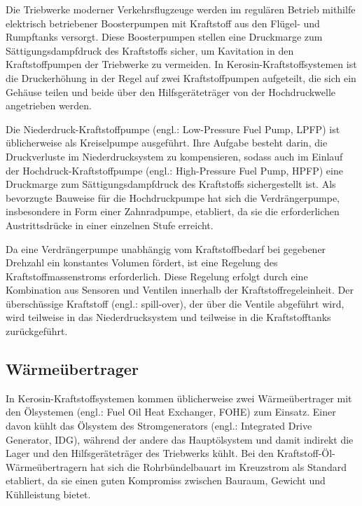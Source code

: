 Die Triebwerke moderner Verkehrsflugzeuge werden im regulären Betrieb mithilfe elektrisch betriebener Boosterpumpen mit Kraftstoff aus den Flügel- und Rumpftanks versorgt. Diese Boosterpumpen stellen eine Druckmarge zum Sättigungsdampfdruck des Kraftstoffs sicher, um Kavitation in den Kraftstoffpumpen der Triebwerke zu vermeiden. In Kerosin-Kraftstoffsystemen ist die Druckerhöhung in der Regel auf zwei Kraftstoffpumpen aufgeteilt, die sich ein Gehäuse teilen und beide über den Hilfsgeräteträger von der Hochdruckwelle angetrieben werden. \cite{Braunling.2015}

Die Niederdruck-Kraftstoffpumpe (engl.: Low-Pressure Fuel Pump, LPFP) ist üblicherweise als Kreiselpumpe ausgeführt. Ihre Aufgabe besteht darin, die Druckverluste im Niederdrucksystem zu kompensieren, sodass auch im Einlauf der Hochdruck-Kraftstoffpumpe (engl.: High-Pressure Fuel Pump, HPFP) eine  Druckmarge zum Sättigungsdampfdruck des Kraftstoffs sichergestellt ist. Als bevorzugte Bauweise für die Hochdruckpumpe hat sich die Verdrängerpumpe, insbesondere in Form einer Zahnradpumpe, etabliert, da sie  die erforderlichen Austrittsdrücke in einer einzelnen Stufe erreicht. \cite{Braunling.2015}

Da eine Verdrängerpumpe unabhängig vom Kraftstoffbedarf bei gegebener Drehzahl ein konstantes Volumen fördert, ist eine Regelung des Kraftstoffmassenstroms erforderlich. Diese Regelung erfolgt durch eine Kombination aus Sensoren und Ventilen innerhalb der Kraftstoffregeleinheit. Der überschüssige Kraftstoff (engl.: spill-over), der über die Ventile abgeführt wird, wird teilweise in das Niederdrucksystem und teilweise in die Kraftstofftanks zurückgeführt. \cite{Braunling.2015}

\subsection{Wärmeübertrager}

In Kerosin-Kraftstoffsystemen kommen üblicherweise zwei Wärmeübertrager mit den Ölsystemen (engl.: Fuel Oil Heat Exchanger, FOHE) zum Einsatz. Einer davon kühlt das Ölsystem des Stromgenerators (engl.: Integrated Drive Generator, IDG), während der andere das Hauptölsystem und damit indirekt die Lager und den Hilfsgeräteträger des Triebwerks kühlt. Bei den Kraftstoff-Öl-Wärmeübertragern hat sich die Rohrbündelbauart im Kreuzstrom als Standard etabliert, da sie einen guten Kompromiss zwischen Bauraum, Gewicht und Kühlleistung bietet. \cite{Braunling.2015, LinkeDiesinger.2014}

